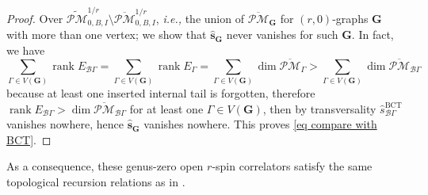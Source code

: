 \documentclass[11pt]{amsart}
\theoremstyle{definition}
\theoremstyle{remark}
\newcommand{\oPMb}{{\overline{\mathcal{PM}}}}
\newcommand{\<}{\left<}
\renewcommand{\>}{\right>}
\numberwithin{equation}{section}
\DeclareMathOperator{\rk}{rank}
\begin{document}
\begin{proof}
    Over $\widetilde{\mathcal{PM}}^{1/r}_{0,B,I}\setminus \oPMb^{1/r}_{0,B,I} $, \textit{i.e.,} the union of $\oPMb_{\bm{G}}$ for $(r,0)$-graphs $\bm{G}$ with more than one vertex; we show that $\hat{\bm{s}}_{\bm{G}}$ never vanishes for such $\bm{G}$. In fact, we %
have
    $$
   \sum_{\Gamma\in V(\bm{G})}\rk E_{\mathcal B\Gamma}= \sum_{\Gamma\in V(\bm{G})}\rk E_{\Gamma} =\sum_{\Gamma\in V(\bm{G})} \dim \oPMb_{\Gamma}>\sum_{\Gamma\in V(\bm{G})} \dim \oPMb_{\mathcal B\Gamma}
    $$
    because %
at least one inserted internal tail is forgotten, therefore $\rk E_{\mathcal B\Gamma}>\dim \oPMb_{\mathcal B\Gamma}$ for at least one $\Gamma \in V(\bm{G})$, then by transversality $\hat {s}^{\text{BCT}}_{\mathcal B \Gamma}$ vanishes nowhere, hence $\hat{\bm{s}}_{\bm{G}}$ vanishes nowhere. This %
proves \eqref{eq compare with BCT}.
        
        
    \end{proof}

    As %
a consequence, these genus-zero open $r$-spin correlators satisfy the same topological recursion relations as in \cite{BCT2}.
    
\end{document}
